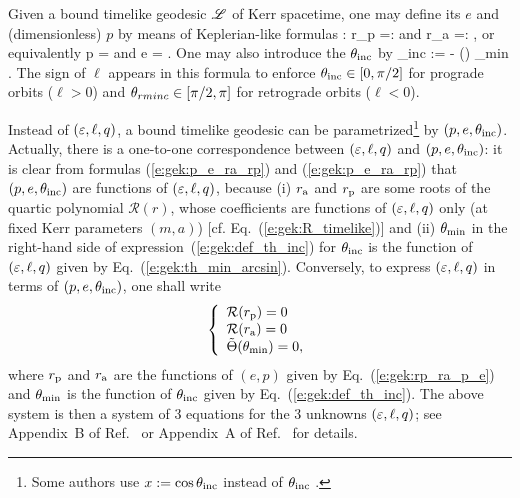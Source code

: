 Given a bound timelike geodesic $\mathscr{L}$ of Kerr spacetime, one may define
its  $e$ and (dimensionless)
 $p$ by means of Keplerian-like formulas \cite{Schmi02,DrascH06,SteinW20}:
\be \label{e:gek:rp_ra_p_e}
    r_{\rm p} =:  \qquad\mbox{and}\qquad
    r_{\rm a} =:  ,
\ee
or equivalently
\be \label{e:gek:p_e_ra_rp}
    p = 
    \qquad\mbox{and}\qquad
    e =  .
\ee
One may also introduce the  $\theta_{\rm inc}$ by
\be \label{e:gek:def_th_inc}
    \th_{\rm inc} :=  - (\ell) \th_{\rm min} .
\ee
The sign of $\ell$ appears in this formula to enforce $\theta_{\rm inc} \in [0, \pi/2]$
for prograde orbits ($\ell > 0$) and $\theta_{rm inc} \in [\pi/2, \pi]$ for retrograde
orbits ($\ell < 0$).

Instead of $(\varepsilon,\ell,q)$, a bound timelike geodesic
can be parametrized\footnote{Some authors use $x:=\cos\theta_{\rm inc}$
instead of $\theta_{\rm inc}$ \cite{SteinW20}.}
by $(p, e, \theta_{\rm inc})$. Actually, there is a one-to-one
correspondence between $(\varepsilon,\ell,q)$ and $(p, e, \theta_{\rm inc})$:
it is clear from formulas (\ref{e:gek:p_e_ra_rp}) and (\ref{e:gek:p_e_ra_rp})
that $(p, e, \theta_{\rm inc})$ are functions of $(\varepsilon,\ell,q)$, because
(i) $r_{\rm a}$ and $r_{\rm p}$ are some roots of the quartic polynomial
$\mathcal{R}(r)$, whose coefficients are functions of $(\varepsilon,\ell,q)$ only
(at fixed Kerr parameters $(m, a)$) [cf. Eq.~(\ref{e:gek:R_timelike})] and
(ii) $\theta_{\rm min}$ in the right-hand side of expression~(\ref{e:gek:def_th_inc}) for
$\theta_{\rm inc}$ is the function of $(\varepsilon,\ell,q)$ given by Eq.~(\ref{e:gek:th_min_arcsin}).
Conversely, to express $(\varepsilon,\ell,q)$ in terms of $(p, e, \theta_{\rm inc})$,
one shall write
\[
    \left\{ \begin{array}{l}
        \mathcal{R}(r_{\rm p}) = 0 \\
        \mathcal{R}(r_{\rm a}) = 0 \\
        \tilde{\Theta}(\theta_{\rm min}) = 0 ,
        \end{array} \right.
\]
where $r_{\rm p}$ and $r_{\rm a}$ are the functions of $(e,p)$ given
by Eq.~(\ref{e:gek:rp_ra_p_e}) and $\theta_{\rm min}$ is the function
of $\theta_{\rm inc}$ given by Eq.~(\ref{e:gek:def_th_inc}). The above system
is then a system of 3 equations for the 3 unknowns $(\varepsilon,\ell,q)$; see
Appendix~B of Ref.~\cite{Schmi02} or Appendix~A of Ref.~\cite{DrascH06} for details.

